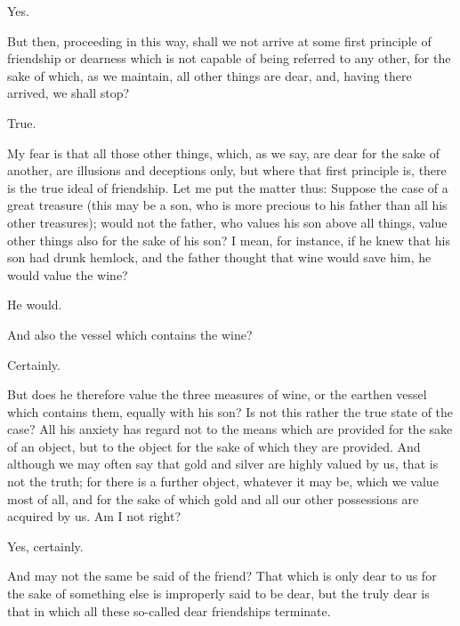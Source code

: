 \documentclass[11pt,letter]{article}
\begin{document}
\par  Yes.

\par  But then, proceeding in this way, shall we not arrive at some first principle of friendship or dearness which is not capable of being referred to any other, for the sake of which, as we maintain, all other things are dear, and, having there arrived, we shall stop?

\par  True.

\par  My fear is that all those other things, which, as we say, are dear for the sake of another, are illusions and deceptions only, but where that first principle is, there is the true ideal of friendship. Let me put the matter thus: Suppose the case of a great treasure (this may be a son, who is more precious to his father than all his other treasures); would not the father, who values his son above all things, value other things also for the sake of his son? I mean, for instance, if he knew that his son had drunk hemlock, and the father thought that wine would save him, he would value the wine?

\par  He would.

\par  And also the vessel which contains the wine?

\par  Certainly.

\par  But does he therefore value the three measures of wine, or the earthen vessel which contains them, equally with his son? Is not this rather the true state of the case? All his anxiety has regard not to the means which are provided for the sake of an object, but to the object for the sake of which they are provided. And although we may often say that gold and silver are highly valued by us, that is not the truth; for there is a further object, whatever it may be, which we value most of all, and for the sake of which gold and all our other possessions are acquired by us. Am I not right?

\par  Yes, certainly.

\par  And may not the same be said of the friend? That which is only dear to us for the sake of something else is improperly said to be dear, but the truly dear is that in which all these so-called dear friendships terminate.
\end{document}
